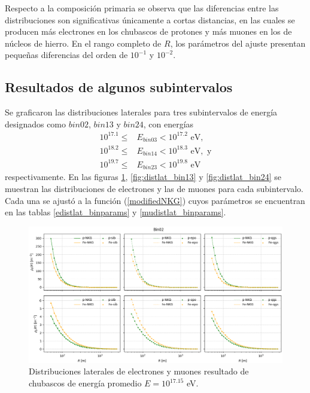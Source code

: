 Respecto a la composición primaria se observa que las diferencias entre las distribuciones son significativas únicamente a cortas distancias, en las cuales se producen más electrones en los chubascos de protones y más muones en los de núcleos de hierro. En el rango completo de $R$, los parámetros del ajuste presentan pequeñas diferencias del orden de $10^{-1}$ y $10^{-2}$.
	
	\subsection{Resultados de algunos subintervalos}
	Se graficaron las distribuciones laterales para tres subintervalos de energía designados como $bin02$, $bin13$ y $bin24$, con energías
\begin{align*}
10^{17.1} \leq & E_{bin03} < 10^{17.2} \text{ eV}, \\
10^{18.2} \leq & E_{bin14} < 10^{18.3} \text{ eV}, \text{ y}\\
10^{19.7} \leq & E_{bin23} < 10^{19.8} \text{ eV}
\end{align*}	
	 respectivamente. En las figuras \ref{fig:distlat_bin02}, \ref{fig:distlat_bin13} y \ref{fig:distlat_bin24} se muestran las distribuciones de electrones y las de muones para cada subintervalo. Cada una se ajustó a la función (\ref{modifiedNKG}) cuyos parámetros se encuentran en las tablas \ref{edistlat_binparams} y \ref{mudistlat_binparams}. \\

\begin{figure}[h] 
\centering
\includegraphics[width=\textwidth]{Figuras/distlat_bin02}
\caption{Distribuciones laterales de electrones y muones resultado de chubascos de energía promedio $E=10^{17.15}$ eV.}
\label{fig:distlat_bin02}
\end{figure}

